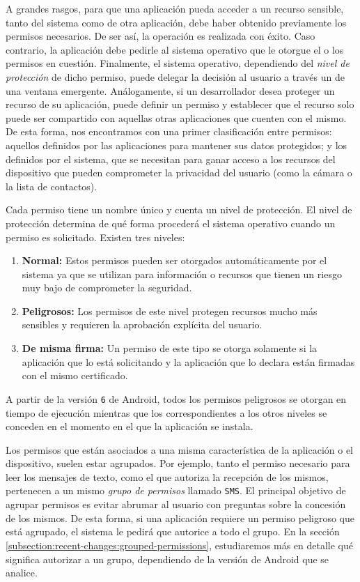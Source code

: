 A grandes rasgos, para que una aplicación pueda acceder a un recurso sensible, tanto del sistema como de
otra aplicación, debe haber obtenido previamente los permisos necesarios. De ser así, la operación es
realizada con éxito. Caso contrario, la aplicación debe pedirle al sistema operativo que le otorgue el o
los permisos en cuestión. Finalmente, el sistema operativo, dependiendo del \textit{nivel de protección}
de dicho permiso, puede delegar la decisión al usuario a través un de una ventana emergente.
Análogamente, si un desarrollador desea proteger un recurso de su aplicación, puede definir un permiso y
establecer que el recurso solo puede ser compartido con aquellas otras aplicaciones que cuenten con el
mismo. De esta forma, nos encontramos con una primer clasificación entre permisos: aquellos definidos por
las aplicaciones para mantener sus datos protegidos; y los definidos por el sistema, que se necesitan
para ganar acceso a los recursos del dispositivo que pueden comprometer la privacidad del usuario (como
la cámara o la lista de contactos).

Cada permiso tiene un nombre único y cuenta un nivel de protección. El nivel de protección determina de
qué forma procederá el sistema operativo cuando un permiso es solicitado. Existen tres niveles:

\begin{enumerate}
    \item \textbf{Normal:} Estos permisos pueden ser otorgados automáticamente por el sistema ya que se
          utilizan para información o recursos que tienen un riesgo muy bajo de comprometer la seguridad.
    \item \textbf{Peligrosos:} Los permisos de este nivel protegen recursos mucho más sensibles y
          requieren la aprobación explícita del usuario.
    \item \textbf{De misma firma:} Un permiso de este tipo se otorga solamente si la aplicación que lo
          está solicitando y la aplicación que lo declara están firmadas con el mismo certificado.
\end{enumerate}

A partir de la versión \texttt{6} de Android, todos los permisos peligrosos se otorgan en tiempo de
ejecución mientras que los correspondientes a los otros niveles se conceden en el momento en el que la
aplicación se instala.

Los permisos que están asociados a una misma característica de la aplicación o el dispositivo, suelen
estar agrupados. Por ejemplo, tanto el permiso necesario para leer los mensajes de texto, como el que
autoriza la recepción de los mismos, pertenecen a un mismo \textit{grupo de permisos} llamado
\texttt{SMS}. El principal objetivo de agrupar permisos es evitar abrumar al usuario con preguntas sobre
la concesión de los mismos. De esta forma, si una aplicación requiere un permiso peligroso que está
agrupado, el sistema le pedirá que autorice a todo el grupo. En la sección
\ref{subsection:recent-changes:grouped-permissions}, estudiaremos más en detalle qué significa autorizar
a un grupo, dependiendo de la versión de Android que se analice.

